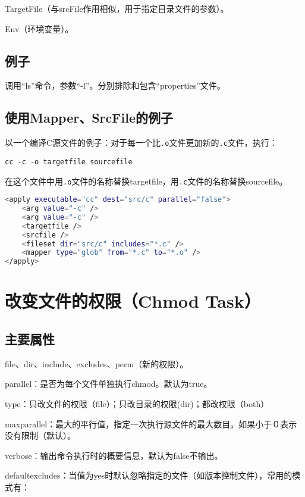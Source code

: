 TargetFile（与srcFile作用相似，用于指定目录文件的参数）。

Env（环境变量）。

\subsection{例子}

调用“ls”命令，参数“-l”。分别排除和包含“properties”文件。



\subsection{使用Mapper、SrcFile的例子}

以一个编译C源文件的例子：对于每一个比\verb|.o|文件更加新的\verb|.c|文件，执行：

\verb|cc -c -o targetfile sourcefile|

在这个文件中用\verb|.o|文件的名称替换targetfile，用\verb|.c|文件的名称替换sourcefile。

\begin{lstlisting}[language=Bash]
<apply executable="cc" dest="src/c" parallel="false">
	<arg value="-c" />
	<arg value="-c" />
	<targetfile />
	<srcfile />
	<fileset dir="src/c" includes="*.c" />
	<mapper type="glob" from="*.c" to="*.o" />
</apply>
\end{lstlisting}




\section{改变文件的权限（Chmod Task）}

\subsection{主要属性}

file、dir、include、excludes、perm（新的权限）。

parallel：是否为每个文件单独执行chmod。默认为true。

type：只改文件的权限（file）；只改目录的权限(dir)；都改权限（both）

maxparallel：最大的平行值，指定一次执行源文件的最大数目。如果小于０表示没有限制（默认）。

verbose：输出命令执行时的概要信息，默认为false不输出。

defaultexcludes：当值为yes时默认忽略指定的文件（如版本控制文件），常用的模式有：

